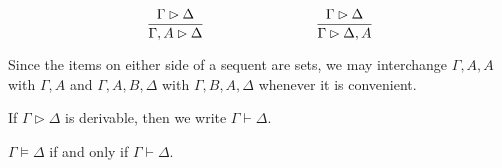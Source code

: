\documentclass{article}
\begin{document}
\[%
\sequent{\Gamma}{\Delta}{\Gamma, A}{\Delta} \hspace{8em}
\sequent{\Gamma}{\Delta}{\Gamma}{\Delta, A}
\]
\begin{proposition}
    Since the items on either side of a sequent are sets, we may interchange $\Gamma, A, A$ with $\Gamma, A$ and $\Gamma, A, B, \Delta$ with $\Gamma, B, A, \Delta$ whenever it is convenient.
\end{proposition}

\begin{notation}
    If $\Gamma \rhd \Delta$ is derivable, then we write $\Gamma \vdash \Delta$.
\end{notation}

\begin{proposition}
    $\Gamma \models \Delta$ if and only if $\Gamma \vdash \Delta$.
\end{proposition}
\end{document}
